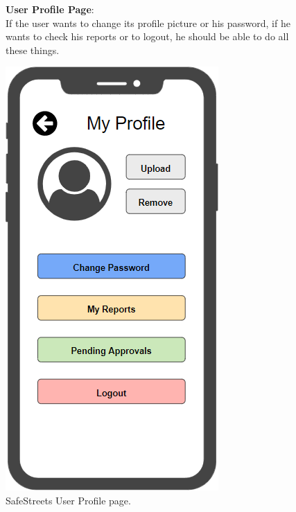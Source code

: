 \begin{figure}
	\begin{flushleft}
		\textbf{User Profile Page}:\\
		If the user wants to change its profile picture or his password, if he wants to check his reports or to logout, he should be able to do all these things. 
	\end{flushleft}
	\centering
	\includegraphics[width=0.6\linewidth]{images/mockups/profile}
	\caption{SafeStreets User Profile page.}
	\label{fig:profile}
\end{figure}
\clearpage
